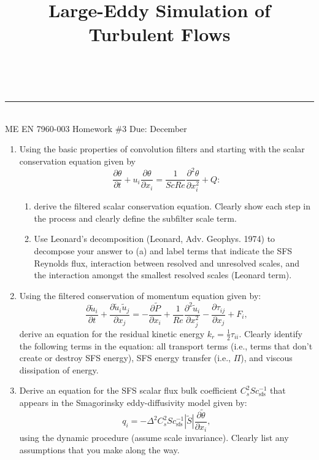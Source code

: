 \documentclass[11pt]{article}
\makeatletter
\newcommand{\linia}{\rule{\linewidth}{0.5pt}}
\renewcommand{\maketitle}{
\begin{center}
\vspace{2ex}
{\huge \textsc{\@title}}
\vspace{1ex}
\\
\linia\\
ME EN 7960-003 \hfill Homework \#3 \hfill Due: December \nth{1}
\vspace{4ex}
\end{center}
}
\makeatother
\begin{document}
\title{Large-Eddy Simulation of Turbulent Flows}

\maketitle

\begin{enumerate}

\item Using the basic properties of convolution filters and starting with the scalar conservation equation given by
\begin{displaymath}
\frac{\partial \theta}{\partial t} + u_i\frac{\partial \theta}{\partial x_i} = \frac{1}{ScRe}\frac{\partial^2 \theta}{\partial x_i^2}+Q :
\end{displaymath}

\begin{enumerate}
\item derive the filtered scalar conservation equation.  Clearly show each step in the process and clearly define the subfilter scale term.
\item Use Leonard's decomposition (Leonard, Adv. Geophys. 1974) to decompose your answer to (a) and label terms that indicate the SFS Reynolds flux, interaction between resolved and unresolved scales, and the interaction amongst the smallest resolved scales (Leonard term).
\end{enumerate}

\item Using the filtered conservation of momentum equation given by:
\begin{displaymath}
\frac{\partial \tilde{u}_i}{\partial t} + \frac{\partial \tilde{u}_i\tilde{u}_j}{\partial x_j} = 
-\frac{\partial \tilde{P}}{\partial x_i} + \frac{1}{Re}\frac{\partial^2 \tilde{u}_i}{\partial x_j^2}-\frac{\partial \tau_{ij}}{\partial x_j}+F_i,
\end{displaymath}
derive an equation for the residual kinetic energy $k_r=\frac{1}{2}\tau_{ii}$.  Clearly identify the following terms in the equation: all transport terms (i.e., terms that don't create or destroy SFS energy), SFS energy transfer (i.e., $\Pi$), and viscous dissipation of energy.

\item Derive an equation for the SFS scalar flux bulk coefficient $C_s^2Sc_{\text{sfs}}^{-1}$ that appears in the Smagorinsky eddy-diffusivity model given by:  
\begin{displaymath}
q_i=-\Delta^2 C_s^2Sc_{\text{sfs}}^{-1} |\tilde{S}|\frac{\partial \tilde{\theta}}{\partial x_i},
\end{displaymath} 
using the dynamic procedure (assume scale invariance).  Clearly list any assumptions that you make along the way.


\end{enumerate}
\end{document}

